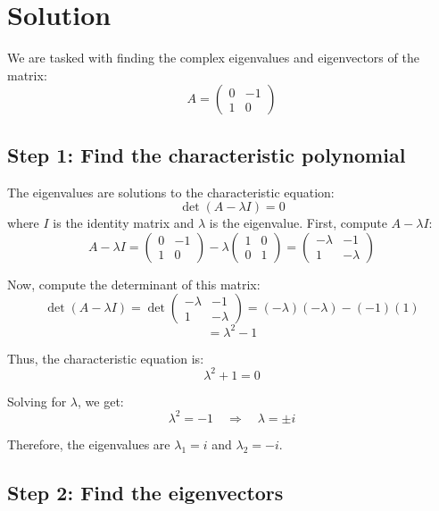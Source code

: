 \documentclass[11pt]{article}
\begin{document}
\newpage

\section{Solution}

We are tasked with finding the complex eigenvalues and eigenvectors of the matrix:
\[
A = \begin{pmatrix} 0 & -1 \\ 1 & 0 \end{pmatrix}
\]

\newpage

\subsection{Step 1: Find the characteristic polynomial}

The eigenvalues are solutions to the characteristic equation:
\[
\det(A - \lambda I) = 0
\]
where \( I \) is the identity matrix and \( \lambda \) is the eigenvalue. First, compute \( A - \lambda I \):
\[
A - \lambda I = \begin{pmatrix} 0 & -1 \\ 1 & 0 \end{pmatrix} - \lambda \begin{pmatrix} 1 & 0 \\ 0 & 1 \end{pmatrix} = \begin{pmatrix} -\lambda & -1 \\ 1 & -\lambda \end{pmatrix}
\]

Now, compute the determinant of this matrix:
\[
\det(A - \lambda I) = \det\begin{pmatrix} -\lambda & -1 \\ 1 & -\lambda \end{pmatrix} = (-\lambda)(-\lambda) - (-1)(1)
\]
\[
= \lambda^2 - 1
\]

Thus, the characteristic equation is:
\[
\lambda^2 + 1 = 0
\]

Solving for \( \lambda \), we get:
\[
\lambda^2 = -1 \quad \Rightarrow \quad \lambda = \pm i
\]

Therefore, the eigenvalues are \( \lambda_1 = i \) and \( \lambda_2 = -i \).

\newpage

\subsection{Step 2: Find the eigenvectors}
\end{document}
